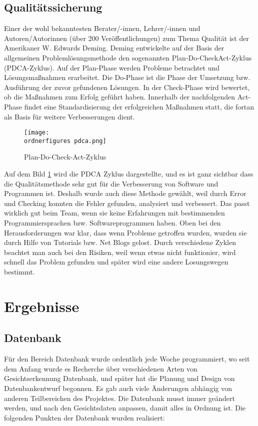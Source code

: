\section{Qualitätssicherung}
Einer der wohl bekanntesten Berater/-innen, Lehrer/-innen und Autoren/Autorinnen (über 200
Veröffentlichungen) zum Thema Qualität ist der Amerikaner W. Edwards Deming. Deming
entwickelte auf der Basis der allgemeinen Problemlösungsmethode den sogenannten Plan-Do-CheckAct-Zyklus (PDCA-Zyklus). Auf der Plan-Phase werden Probleme betrachtet und Lösungsmaßnahmen
erarbeitet. Die Do-Phase ist die Phase der Umsetzung bzw. Ausführung der zuvor gefundenen
Lösungen. In der Check-Phase wird bewertet, ob die Maßnahmen zum Erfolg geführt haben.
Innerhalb der nachfolgenden Act-Phase findet eine Standardisierung der erfolgreichen Maßnahmen
statt, die fortan als Basis für weitere Verbesserungen dient.\cite{PDCA-Zyklus}
\bigbreak 
\begin{figure}
	\centering
	\texttt{[image: \\ordnerfigures pdca.png]}
	\caption{ Plan-Do-Check-Act-Zyklus}
	\label{fig:pdca}
	\cite{PDCA-Zyklus}
\end{figure}

Auf dem Bild \ref{fig:pdca} wird die PDCA Zyklus dargestellte, und es ist ganz sichtbar dass die Qualitätsmethode sehr gut für die Verbesserung von Software und Programmen ist. Deshalb wurde auch diese Methode gewählt, weil durch Error und Checking konnten die Fehler gefunden, analysiert und verbessert. Das passt wirklich gut beim Team, wenn sie keine Erfahrungen mit bestimmenden Programmiersprachen bzw. Softwareprogrammen haben.
\bigbreak
Oben bei den Herausforderungen war klar, dass wenn Probleme getroffen wurden, wurden sie durch Hilfe von Tutorials bzw. Net Blogs gelost. Durch verschiedene Zyklen beachtet man auch bei den Risiken, weil wenn etwas nicht funktionier, wird schnell das Problem gefunden und später wird eine andere Losungswegen bestimmt.
 
\chapter{Ergebnisse }
\section{Datenbank}
Für den Bereich Datenbank wurde ordentlich jede Woche programmiert, wo seit dem Anfang wurde es Recherche über verschiedenen Arten von Gesichtserkennung Datenbank, und später hat die Planung und Design von Datenbankentwurf begonnen. Es gab auch viele Änderungen abhängig von anderen Teilbereichen des Projektes. Die Datenbank musst immer geändert werden, und nach den Gesichtsdaten anpassen, damit alles in Ordnung ist.
Die folgenden Punkten der Datenbank wurden realisiert:

